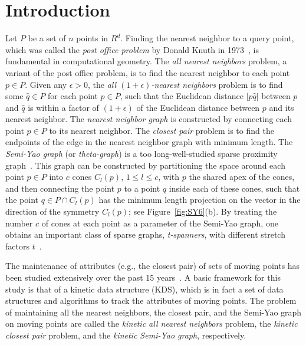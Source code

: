\documentclass[11pt]{llncs}
\begin{document}
\section{Introduction}
Let $P$ be a set of $n$ points in $R^d$. Finding the nearest neighbor to a query point, which was called the \textit{post office problem} by Donald Knuth in 1973~\cite{Knuth:1973:ACP}, is fundamental in computational geometry. The \textit{all nearest neighbors} problem, a variant of the post office problem, is to find the nearest neighbor to each point $p\in P$. Given any $\epsilon>0$, the \textit{all $(1+\epsilon)$-nearest neighbors} problem is to find some $\hat{q}\in P$ for each point $p\in P$, such that the Euclidean distance $|p\hat{q}|$ between $p$ and $\hat{q}$ is within a factor of $(1+\epsilon)$ of the Euclidean distance between $p$ and its nearest neighbor. The \textit{nearest neighbor graph} is constructed by connecting each point $p\in P$ to its nearest neighbor. The \textit{closest pair} problem is to find the endpoints of the edge in the nearest neighbor graph with minimum length. The \textit{Semi-Yao graph} (or \textit{theta-graph}) is a too long-well-studied sparse proximity graph~\cite{Clarkson:1987:AAS:28395.28402,Keil:1988:ACE:61764.61787}. This graph can be constructed by partitioning the space around each point $p\in P$ into $c$ cones $C_l(p)$, $1\leq l \leq c$, with $p$ the shared apex of the cones, and then connecting the point $p$ to a point $q$ inside each of these cones, such that the point $q\in P\cap C_l(p)$ has the minimum length projection on the vector in the direction of the symmetry $C_l(p)$; see Figure~\ref{fig:SY6}(b). By treating the number $c$ of cones at each point as a parameter of the Semi-Yao graph, one obtains an important class of sparse graphs, \textit{t-spanners}, with different stretch factors $t$~\cite{BBCRV2013Theta4,Bonichon:2010:CTD:1939238.1939265,BMRV2013Theta5,BRV2013Theta4k345}. 

The maintenance of attributes (e.g., the closest pair) of sets of moving points has been studied extensively over the past 15 years~\cite{DBLP:conf/swat/RahmatiZ12,Agarwal:2003:IMP:846156.846166,Alexandron:2007:KDD:1219156.1219201,Basch:1997:DSM:314161.314435,Karavelas:2001:SKG:365411.365441,DBLP:conf/gd/RahmatiZ12,DBLP:conf/iwoca/RahmatiZ11,DBLP:conf/socg12/Natin}. A basic framework for this study  is that of a kinetic data structure (KDS), which is in fact a set of data structures and algorithms to track the attributes of moving points. The problem of maintaining all the nearest neighbors, the closest pair, and the Semi-Yao graph on moving points are called the \textit{kinetic all nearest neighbors} problem, the \textit{kinetic closest pair} problem, and the \textit{kinetic Semi-Yao graph}, respectively. 
\end{document}

